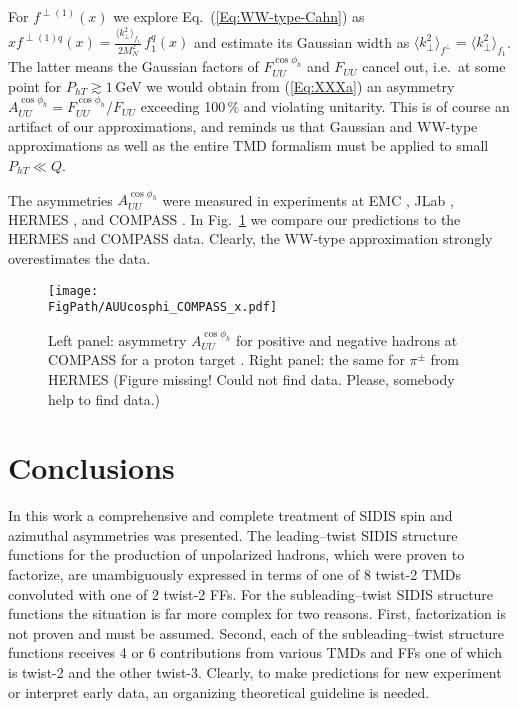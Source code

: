 \documentclass[a4paper,11pt]{article}
\newcommand{\red}[1]{{\color{red} #1}}
\newcommand{\la}{\langle}
\newcommand{\ra}{\rangle}
\def\Phperp{P_{hT}}
\def\kperp{k_\perp}
\newcommand*{\FigPath}{./figs}%
\begin{document}
For $f^{\perp(1)}(x)$ we explore Eq.~(\ref{Eq:WW-type-Cahn}) as
$xf^{\perp(1)q}(x) = \frac{\la\kperp^2\ra_{f_1}}{2M_N^2}\,f_{1}^q(x)$ and 
estimate its Gaussian width as $\la\kperp^2\ra_{f^\perp}=\la\kperp^2\ra_{f_1}$.
The latter means the Gaussian factors of 
$F_{UU}^{\cos\phi_h}$ and $F_{UU}$ cancel out, i.e.\ at some point 
for $\Phperp\gtrsim1\,$GeV we would obtain from (\ref{Eq:XXXa}) 
an asymmetry $A_{UU}^{\cos\phi_h}=F_{UU}^{\cos\phi_h}/F_{UU}$ exceeding
100$\,\%$ and violating unitarity. This is of course an artifact of our 
approximations, and reminds us that Gaussian and WW-type approximations 
as well as the entire TMD formalism must be applied to small $\Phperp\ll Q$.

The asymmetries $A_{UU}^{\cos\phi_h}$ were measured in experiments at
EMC \cite{Aubert:1983cz}, JLab \cite{Osipenko:2008aa,Mkrtchyan:2007sr}, 
HERMES \cite{Airapetian:2012yg}, and COMPASS \cite{Adolph:2014pwc}.
In Fig.~\ref{auucosphi_jlab} we compare our predictions 
to the HERMES and COMPASS data. Clearly, the WW-type
approximation strongly overestimates the data.


\begin{figure}[ht]
\centering
\texttt{[image: \\FigPath/AUUcosphi\_COMPASS\_x.pdf]} 
\caption{\label{auucosphi_jlab} 
	Left panel: asymmetry $A_{UU}^{\cos\phi_h}$ for positive and negative 
	hadrons at COMPASS for a proton target \cite{Adolph:2014pwc}.
	Right panel: the same for $\pi^\pm$ from HERMES \cite{Airapetian:2012yg}
	\red{(Figure missing! Could not find data. Please, somebody
	help to find data.)}}
\end{figure}


{}

\newpage
\section{Conclusions}
\label{Sec-8:conclusions}

In this work a comprehensive and complete treatment of SIDIS
spin and azimuthal asymmetries was presented. The leading--twist
SIDIS structure functions for the production of unpolarized hadrons,
which were proven to factorize, are unambiguously expressed in terms 
of one of 8 twist-2 TMDs convoluted with one of 2 twist-2 FFs.
For the subleading--twist SIDIS structure functions the situation
is far more complex for two reasons. First, factorization is not 
proven and must be assumed. 
Second, each of the subleading--twist structure functions
receives 4 or 6 contributions from various TMDs and FFs one of
which is twist-2 and the other twist-3. Clearly, to make 
predictions for new experiment or interpret early data, an
organizing theoretical guideline is needed.
\end{document}
